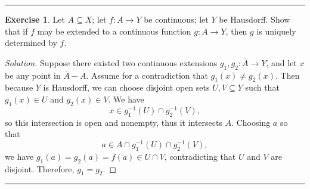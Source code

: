 \documentclass{article}
\theoremstyle{definition}
\newtheorem{exercise}{Exercise}[section]
\begin{document}
\hrule

\begin{exercise}
  Let $A\subseteq X$; let $f:A\to Y$ be continuous; let $Y$ be Hausdorff. Show that if $f$ may be extended to a continuous function $g:\overline{A}\to Y$, then $g$ is uniquely determined by $f$.
\end{exercise}
\begin{proof}[Solution]
  Suppose there existed two continuous extensions $g_1,g_2:\overline{A}\to Y$, and let $x$ be any point in $\overline{A}-A$. Assume for a contradiction that $g_1(x) \ne g_2(x)$. Then because $Y$ is Hausdorff, we can choose disjoint open sets $U,V\subseteq Y$ such that $g_1(x)\in U$ and $g_2(x)\in V$. We have
  $$x\in g_1^{-1}(U)\cap g_2^{-1}(V),$$
  so this intersection is open and nonempty, thus it intersects $A$. Choosing $a$ so that $$a\in A\cap g_1^{-1}(U)\cap g_2^{-1}(V),$$
  we have $g_1(a) = g_2(a) = f(a)\in U\cap V$, contradicting that $U$ and $V$ are disjoint. Therefore, $g_1 = g_2$.
\end{proof}

\hrule
\end{document}
